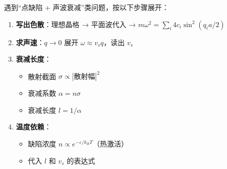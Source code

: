 \begin{thinkbox}
遇到``点缺陷 + 声波衰减''类问题，按以下步骤展开：
\begin{enumerate}
    \item \textbf{写出色散}：理想晶格 → 平面波代入 → $m\omega^2=\sum_i 4c_i\sin^2(q_i a/2)$
    \item \textbf{求声速}：$q\to0$ 展开 $\omega\approx v_s q$，读出 $v_s$
    \item \textbf{衰减长度}：
    \begin{itemize}
        \item 散射截面 $\sigma\propto |\text{散射幅}|^2$
        \item 衰减系数 $\alpha=n\sigma$
        \item 衰减长度 $l=1/\alpha$
    \end{itemize}
    \item \textbf{温度依赖}：
    \begin{itemize}
        \item 缺陷浓度 $n\propto e^{-\varepsilon/k_BT}$（热激活）
        \item 代入 $l$ 和 $v_s$ 的表达式
    \end{itemize}
\end{enumerate}
\end{thinkbox}
